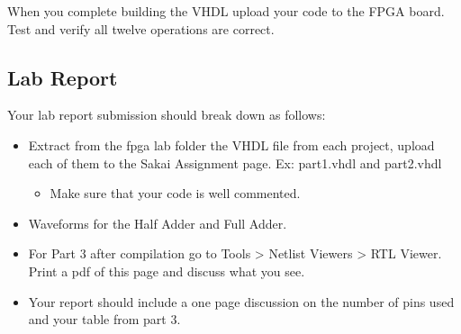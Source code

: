 When you complete building the VHDL upload your code to the FPGA board. Test and verify all twelve operations are correct.

\subsection{Lab Report}
Your lab report submission should break down as follows:
\begin{itemize}
	\item Extract from the fpga lab folder the VHDL file from each project, upload each of them to the Sakai Assignment page. Ex: part1.vhdl and part2.vhdl
	\begin{itemize}
		\item Make sure that your code is well commented.
	\end{itemize}
	\item Waveforms for the Half Adder and Full Adder.
	\item For Part 3 after compilation go to Tools > Netlist Viewers > RTL Viewer. Print a pdf of this page and discuss what you see.
	\item Your report should include a one page discussion on the number of pins used and your table from part 3.
\end{itemize}
